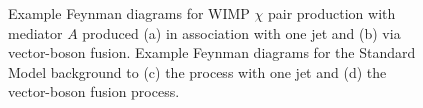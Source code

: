 \documentclass[cernpreprint,txfonts,UKenglish,texlive=2016]{\ATLASLATEXPATH atlasdoc}
\begin{document}
\begin{figure}
	\begin{center}
	\end{center}
	\caption {Example Feynman diagrams for WIMP $\chi$ pair production
          with mediator $A$ produced (a) in
          association with one jet and (b)  via vector-boson
          fusion. Example Feynman diagrams for the Standard Model
          background to (c) the process with one jet and (d) the vector-boson fusion process.} 
  \label{fig:feynmanDM}
\end{figure}
\end{document}
